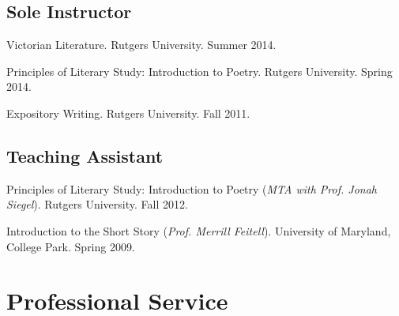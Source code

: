 \documentclass[10pt,letterpaper]{article}
\renewenvironment{itemize}{
  \begin{list}{}{
    \setlength{\leftmargin}{1.5em}
    \setlength{\itemsep}{0.25em}
    \setlength{\parskip}{0pt}
    \setlength{\parsep}{0.25em}
  }
}{
  \end{list}
}
\begin{document}
\subsection*{Sole Instructor}
\begin{itemize}
\item Victorian Literature. Rutgers University. Summer 2014.
\item Principles of Literary Study: Introduction to Poetry. Rutgers University. Spring 2014.
\item Expository Writing. Rutgers University. Fall 2011.
\end{itemize}

\subsection*{Teaching Assistant}
\begin{itemize}
\item Principles of Literary Study: Introduction to Poetry (\emph{MTA with Prof. Jonah Siegel}). Rutgers University. Fall 2012.
\item Introduction to the Short Story (\emph{Prof. Merrill Feitell}). University of Maryland, College Park. Spring 2009.
\end{itemize}


\section*{Professional Service}
\end{document}
